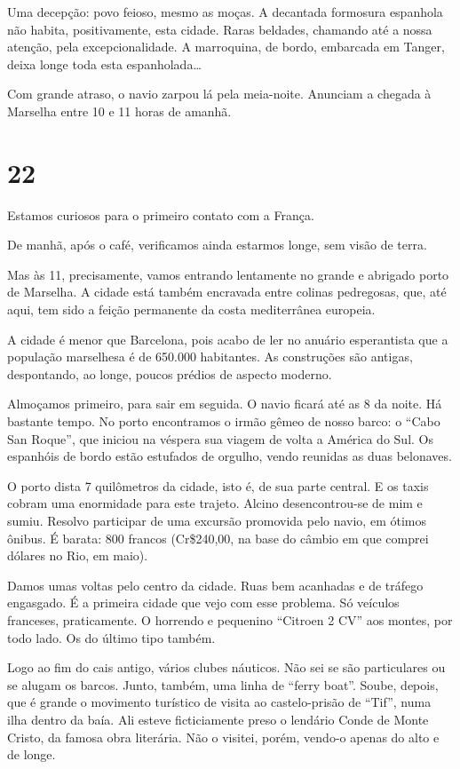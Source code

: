 Uma decepção: povo feioso, mesmo as moças. A decantada formosura espanhola não habita, positivamente, esta cidade. Raras beldades, chamando até a nossa atenção, pela excepcionalidade. A marroquina, de bordo, embarcada em Tanger, deixa longe toda esta espanholada\ldots

Com grande atraso, o navio zarpou lá pela meia-noite. Anunciam a chegada à Marselha entre 10 e 11 horas de amanhã.

\section*{22 \adfflatleafright {}}

Estamos curiosos para o primeiro contato com a França.

De manhã, após o café, verificamos ainda estarmos longe, sem visão de terra.

Mas às 11, precisamente, vamos entrando lentamente no grande e abrigado porto de Marselha. A cidade está também encravada entre colinas pedregosas, que, até aqui, tem sido a feição permanente da costa mediterrânea europeia.

A cidade é menor que Barcelona, pois acabo de ler no anuário esperantista que a população marselhesa é de 650.000 habitantes. As construções são antigas, despontando, ao longe, poucos prédios de aspecto moderno.

Almoçamos primeiro, para sair em seguida. O navio ficará até as 8 da noite. Há bastante tempo. No porto encontramos o irmão gêmeo de nosso barco: o ``Cabo San Roque'', que iniciou na véspera sua viagem de volta a América do Sul. Os espanhóis de bordo estão estufados de orgulho, vendo reunidas as duas belonaves.

O porto dista 7 quilômetros da cidade, isto é, de sua parte central. E os taxis cobram uma enormidade para este trajeto. Alcino desencontrou-se de mim e sumiu. Resolvo participar de uma excursão promovida pelo navio, em ótimos ônibus. É barata: 800 francos (Cr\$240,00, na base do câmbio em que comprei dólares no Rio, em maio).

Damos umas voltas pelo centro da cidade. Ruas bem acanhadas e de tráfego engasgado. É a primeira cidade que vejo com esse problema. Só veículos franceses, praticamente. O horrendo e pequenino ``Citroen 2 CV'' aos montes, por todo lado. Os do último tipo também.

Logo ao fim do cais antigo, vários clubes náuticos. Não sei se são particulares ou se alugam os barcos. Junto, também, uma linha de ``ferry boat''. Soube, depois, que é grande o movimento turístico de visita ao castelo-prisão de ``Tif'', numa ilha dentro da baía. Ali esteve ficticiamente preso o lendário Conde de Monte Cristo, da famosa obra literária. Não o visitei, porém, vendo-o apenas do alto e de longe.

